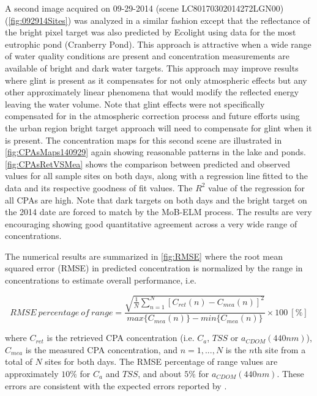 \documentclass[onecolumn,3p,letterpaper]{elsarticle}
\begin{document}
A second image acquired on 09-29-2014 (scene LC80170302014272LGN00) (\autoref{fig:092914Sites}) was analyzed in a similar fashion except that the reflectance of the bright pixel target was also predicted by Ecolight using data for the most eutrophic pond (Cranberry Pond). This approach is attractive when a wide range of water quality conditions are present and concentration measurements are available of bright and dark water targets. This approach may improve results where glint is present as it compensates for not only atmospheric effects but any other approximately linear phenomena that would modify the reflected energy leaving the water volume. Note that glint effects were not specifically compensated for in the atmospheric correction process and future efforts using the urban region bright target approach will need to compensate for glint when it is present. The concentration maps for this second scene are illustrated in \autoref{fig:CPAsMaps140929} again showing reasonable patterns in the lake and ponds. \autoref{fig:CPAsRetVSMea} shows the comparison between predicted and observed values for all sample sites on both days, along with a regression line fitted to the data and its respective goodness of fit values. The $R^2$ value of the regression for all CPAs are high. Note that dark targets on both days and the bright target on the 2014 date are forced to match by the MoB-ELM process. The results are very encouraging showing good quantitative agreement across a very wide range of concentrations. 

The numerical results are summarized in \autoref{fig:RMSE} where the root mean squared error (RMSE) in predicted concentration is normalized by the range in concentrations to estimate overall performance, i.e.

\begin{equation}
\label{eq:error_percentage}
	RMSE~percentage~of~range =\frac{\sqrt{\frac{1}{N}\sum_{n=1}^N{\left[C_{ret}(n) - C_{mea}(n)\right]^2}}}{max\{C_{mea}(n)\} - min\{C_{mea}(n)\}}\times100 ~[\%]
\end{equation}

\noindent where $C_{ret}$ is the retrieved CPA concentration (i.e. $C_a$, $TSS$ or $a_{CDOM}(440nm)$), $C_{mea}$ is the measured CPA concentration, and $n=1,...,N$ is the $n$th site from a total of $N$ sites for both days. The RMSE percentage of range values are approximately $10\%$ for $C_a$ and $TSS$, and about $5\%$ for $a_{CDOM}(440nm)$. These errors are consistent with the expected errors reported by \cite*{Gerace:2013}. 
\end{document}
